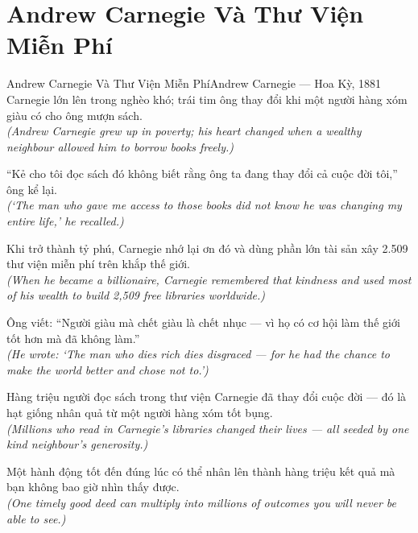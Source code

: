\section{Andrew Carnegie Và Thư Viện Miễn Phí}
\begin{truyen}{Andrew Carnegie Và Thư Viện Miễn Phí}{Andrew Carnegie --- Hoa Kỳ, 1881}
 Carnegie lớn lên trong nghèo khó; trái tim ông thay đổi khi một người hàng xóm giàu có cho ông mượn sách.\\[4pt]
\textit{(Andrew Carnegie grew up in poverty; his heart changed when a wealthy neighbour allowed him to borrow books freely.)}

``Kẻ cho tôi đọc sách đó không biết rằng ông ta đang thay đổi cả cuộc đời tôi,'' ông kể lại.\\[4pt]
\textit{(`The man who gave me access to those books did not know he was changing my entire life,' he recalled.)}

Khi trở thành tỷ phú, Carnegie nhớ lại ơn đó và dùng phần lớn tài sản xây 2.509 thư viện miễn phí trên khắp thế giới.\\[4pt]
\textit{(When he became a billionaire, Carnegie remembered that kindness and used most of his wealth to build 2,509 free libraries worldwide.)}

Ông viết: ``Người giàu mà chết giàu là chết nhục --- vì họ có cơ hội làm thế giới tốt hơn mà đã không làm.''\\[4pt]
\textit{(He wrote: `The man who dies rich dies disgraced --- for he had the chance to make the world better and chose not to.')}

Hàng triệu người đọc sách trong thư viện Carnegie đã thay đổi cuộc đời --- đó là hạt giống nhân quả từ một người hàng xóm tốt bụng.\\[4pt]
\textit{(Millions who read in Carnegie's libraries changed their lives --- all seeded by one kind neighbour's generosity.)}

\end{truyen}
\begin{baihoc}
  Một hành động tốt đến đúng lúc có thể nhân lên thành hàng triệu kết quả mà bạn không bao giờ nhìn thấy được.\\[4pt]
  \textit{(One timely good deed can multiply into millions of outcomes you will never be able to see.)}
\end{baihoc}

